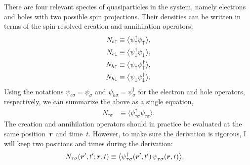 There are four relevant species of quasiparticles in the system, namely electrons and holes with two possible spin projections.
Their densities can be written in terms of the spin-resolved creation and annihilation operators,
\begin{align}
  N_{e\uparrow} &\equiv \big\langle \psi_{\uparrow}^\dagger \psi_{\uparrow}^{\phantom{\dagger}} \big\rangle, \\
  N_{e\downarrow} &\equiv \big\langle \psi_{\downarrow}^\dagger \psi_{\downarrow}^{\phantom{\dagger}} \big\rangle, \\
  N_{h\uparrow} &\equiv \big\langle \psi_{\uparrow}^{\phantom{\dagger}} \psi_{\uparrow}^\dagger \big\rangle, \\
  N_{h\downarrow} &\equiv \big\langle \psi_{\downarrow}^{\phantom{\dagger}} \psi_{\downarrow}^\dagger \big\rangle.
\end{align}
Using the notations $\psi_{e\sigma} = \psi_\sigma$ and $\psi_{h\sigma} = \psi^\dagger_\sigma$ for the electron and hole operators, respectively, we can summarize the above as a single equation,
\begin{align}
  N_{\tau\sigma} &\equiv \big\langle \psi_{\tau\sigma}^\dagger \psi_{\tau\sigma}^{\phantom{\dagger}} \big\rangle.
\end{align}
The creation and annihilation operators should in practice be evaluated at the same position~$\bm{r}$ and time~$t$.
However, to make sure the derivation is rigorous, I will keep two positions and times during the derivation:
\begin{align}
  N_{\tau\sigma}(\bm{r}',t'; \bm{r},t) &\equiv \big\langle \psi_{\tau\sigma}^\dagger(\bm{r}',t')\, \psi_{\tau\sigma}^{\phantom{\dagger}}(\bm{r},t) \big\rangle.
\end{align}

